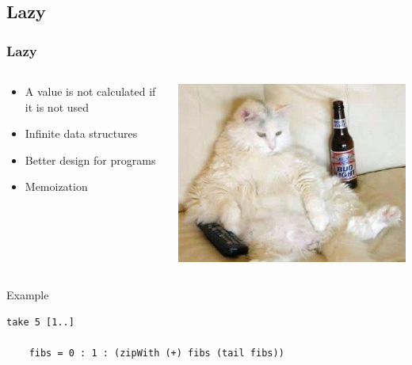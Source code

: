 \documentclass{beamer}
\begin{document}
\subsection{Lazy}
\begin{frame}[fragile]
\frametitle{Lazy}

 \begin{columns}[]
  \begin{column}[]{5cm}
   \begin{itemize}
  \item A value is not calculated if it is not used
  \item Infinite data structures
  \item Better design for programs
  \item Memoization
 \end{itemize}
  \end{column}
  \begin{column}[]{5cm}
    \includegraphics[width=0.8\linewidth]{figs/lazy_cat}
  \end{column}
 \end{columns}

 \vspace{0.5cm}
 \begin{block}{Example}
  \begin{lstlisting}[basicstyle=\small]
    take 5 [1..]

    fibs = 0 : 1 : (zipWith (+) fibs (tail fibs))
  \end{lstlisting}
 \end{block}
 
\end{frame}
\end{document}
